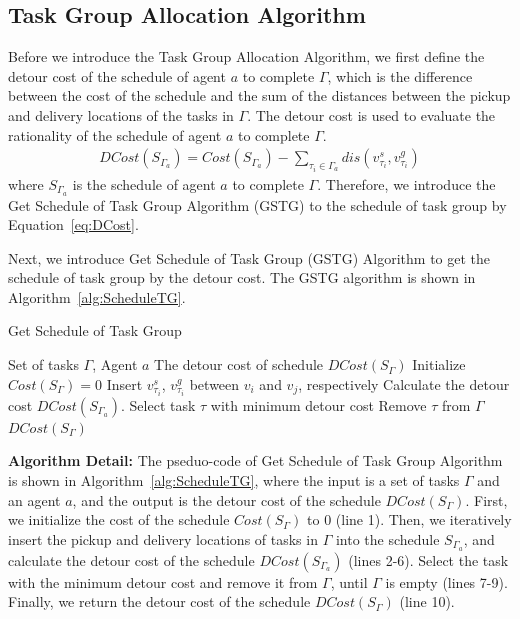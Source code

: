 \documentclass[sigconf,anonymous]{aamas}
\begin{document}
\subsection{Task Group Allocation Algorithm}


Before we introduce the Task Group Allocation Algorithm,
we first define the detour cost of the schedule of agent $a$ to complete $\Gamma$,
which is the difference between the cost of the schedule and the sum of the distances between the pickup and delivery locations of the tasks in $\Gamma$.
The detour cost is used to evaluate the rationality of the schedule of agent $a$ to complete $\Gamma$.
\begin{eqnarray}
  \label{eq:DCost}
  DCost(S_{\Gamma_{a}}) = Cost(S_{\Gamma_{a}}) - \sum_{\tau_i \in \Gamma_a}{dis(v^{s}_{\tau_i}, v^{g}_{\tau_i})}
\end{eqnarray}
where $S_{\Gamma_{a}}$ is the schedule of agent $a$ to complete $\Gamma$.
Therefore, we introduce the Get Schedule of Task Group Algorithm (GSTG) 
to the schedule of task group by Equation~\ref{eq:DCost}.

Next, we introduce Get Schedule of Task Group (GSTG) Algorithm 
to get the schedule of task group by the detour cost.
The GSTG algorithm is shown in Algorithm~\ref{alg:ScheduleTG}.
\begin{algorithm}[htbp]
\caption{Get Schedule of Task Group}
\label{alg:ScheduleTG}
\begin{algorithmic}[1]
\Require Set of tasks $\Gamma$, Agent $a$ %
\Ensure The detour cost of schedule $DCost({S_{\Gamma}})$ %
\State Initialize $Cost({S_{\Gamma}}) = 0$
      \State Insert $v^s_{\tau_i}$, $v^g_{\tau_i}$ between $v_{i}$ and $v_{j}$, respectively
      \State Calculate the detour cost $DCost(S_{\Gamma_{a}})$.
  \EndFor
  \State Select task $\tau$ with minimum detour cost
  \State Remove $\tau$ from $\Gamma$
\EndWhile
\State \Return $DCost({S_{\Gamma}})$
\end{algorithmic}
\end{algorithm}

\textbf{Algorithm Detail:}
The pseduo-code of Get Schedule of Task Group Algorithm is shown in Algorithm~\ref{alg:ScheduleTG},
where the input is a set of tasks $\Gamma$ and an agent $a$,
and the output is the detour cost of the schedule $DCost({S_{\Gamma}})$.
First, we initialize the cost of the schedule $Cost({S_{\Gamma}})$ to 0 (line 1).
Then, we iteratively insert the pickup and delivery locations of tasks in $\Gamma$ into the schedule $S_{\Gamma_a}$,
and calculate the detour cost of the schedule $DCost(S_{\Gamma_{a}})$ (lines 2-6).
Select the task with the minimum detour cost and remove it from $\Gamma$,
until $\Gamma$ is empty (lines 7-9).
Finally, we return the detour cost of the schedule $DCost({S_{\Gamma}})$ (line 10).
\end{document}
